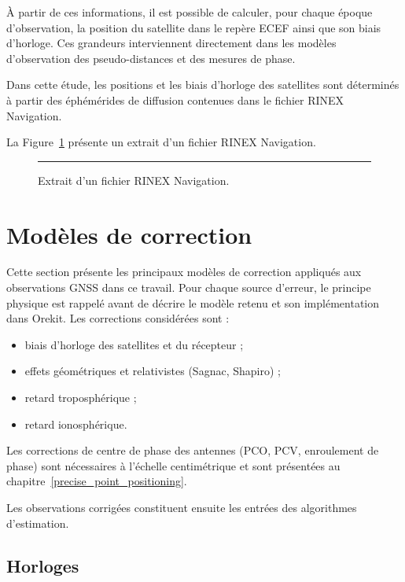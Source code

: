 À partir de ces informations, il est possible de calculer, pour chaque époque d'observation, la position du satellite dans le repère ECEF ainsi que son biais d'horloge. Ces grandeurs interviennent directement dans les modèles d'observation des pseudo-distances et des mesures de phase.

Dans cette étude, les positions et les biais d'horloge des satellites sont déterminés à partir des éphémérides de diffusion contenues dans le fichier RINEX Navigation.

La Figure~\ref{fig:rinex_nav} présente un extrait d'un fichier RINEX Navigation.

\begin{figure}[htbp]
    \centering
    \rule{0.8\linewidth}{5cm} %
    \caption{Extrait d'un fichier RINEX Navigation.}
    \label{fig:rinex_nav}
\end{figure}



\section{Modèles de correction} \label{correction}

Cette section présente les principaux modèles de correction appliqués aux observations GNSS dans ce travail. Pour chaque source d'erreur, le principe physique est rappelé avant de décrire le modèle retenu et son implémentation dans Orekit. Les corrections considérées sont :

\begin{itemize}
    \item biais d'horloge des satellites et du récepteur ;
    \item effets géométriques et relativistes (Sagnac, Shapiro) ;
    \item retard troposphérique ;
    \item retard ionosphérique.
\end{itemize}

Les corrections de centre de phase des antennes (PCO, PCV, enroulement de phase) sont nécessaires à l'échelle centimétrique et sont présentées au chapitre~\ref{precise_point_positioning}.

Les observations corrigées constituent ensuite les entrées des algorithmes d'estimation.

\subsection{Horloges}

